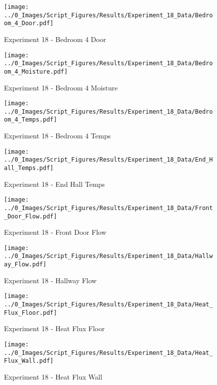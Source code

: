 	\begin{figure}[H]
		\centering
		\texttt{[image: ../0\_Images/Script\_Figures/Results/Experiment\_18\_Data/Bedroom\_4\_Door.pdf]}
		\caption[]{Experiment 18 - Bedroom 4 Door}
	\end{figure}
 
	\clearpage

	\begin{figure}[H]
		\centering
		\texttt{[image: ../0\_Images/Script\_Figures/Results/Experiment\_18\_Data/Bedroom\_4\_Moisture.pdf]}
		\caption[]{Experiment 18 - Bedroom 4 Moisture}
	\end{figure}
 

	\begin{figure}[H]
		\centering
		\texttt{[image: ../0\_Images/Script\_Figures/Results/Experiment\_18\_Data/Bedroom\_4\_Temps.pdf]}
		\caption[]{Experiment 18 - Bedroom 4 Temps}
	\end{figure}
 
	\clearpage

	\begin{figure}[H]
		\centering
		\texttt{[image: ../0\_Images/Script\_Figures/Results/Experiment\_18\_Data/End\_Hall\_Temps.pdf]}
		\caption[]{Experiment 18 - End Hall Temps}
	\end{figure}
 

	\begin{figure}[H]
		\centering
		\texttt{[image: ../0\_Images/Script\_Figures/Results/Experiment\_18\_Data/Front\_Door\_Flow.pdf]}
		\caption[]{Experiment 18 - Front Door Flow}
	\end{figure}
 
	\clearpage

	\begin{figure}[H]
		\centering
		\texttt{[image: ../0\_Images/Script\_Figures/Results/Experiment\_18\_Data/Hallway\_Flow.pdf]}
		\caption[]{Experiment 18 - Hallway Flow}
	\end{figure}
 

	\begin{figure}[H]
		\centering
		\texttt{[image: ../0\_Images/Script\_Figures/Results/Experiment\_18\_Data/Heat\_Flux\_Floor.pdf]}
		\caption[]{Experiment 18 - Heat Flux Floor}
	\end{figure}
 
	\clearpage

	\begin{figure}[H]
		\centering
		\texttt{[image: ../0\_Images/Script\_Figures/Results/Experiment\_18\_Data/Heat\_Flux\_Wall.pdf]}
		\caption[]{Experiment 18 - Heat Flux Wall}
	\end{figure}
 

